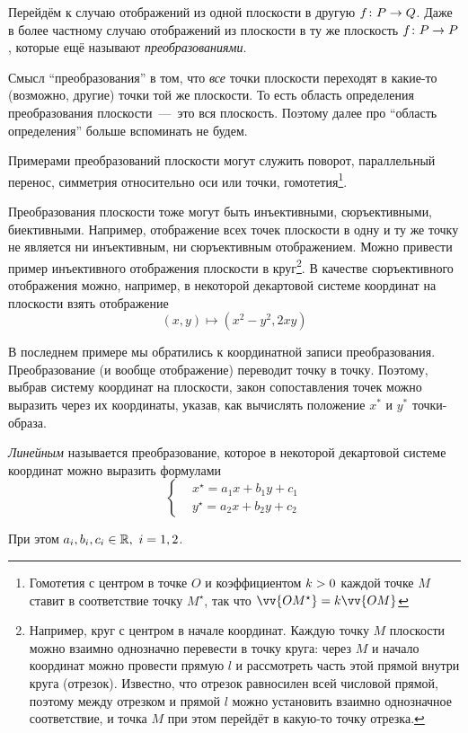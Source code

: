 \documentclass[a4paper,12pt]{article}
\begin{document}
  Перейдём к случаю отображений из одной плоскости в другую $f\colon P \hm\to Q$.
  Даже в более частному случаю отображений из плоскости в ту же плоскость $f\colon P \hm\to P$, которые ещё называют \emph{преобразованиями}.
  
  \begin{remark}
    Смысл ``преобразования'' в том, что \emph{все} точки плоскости переходят в какие-то (возможно, другие) точки той же плоскости.
    То есть область определения преобразования плоскости~---~это вся плоскость.
    Поэтому далее про ``область определения'' больше вспоминать не будем.
  \end{remark}
  
  Примерами преобразований плоскости могут служить поворот, параллельный перенос, симметрия относительно оси или точки, гомотетия\footnote{Гомотетия с центром в точке $O$ и коэффициентом $k \hm> 0 $ каждой точке $M$ ставит в соответствие точку $M^\star$, так что $\vv{OM^\star} \hm= k\vv{OM}$}.
  
  Преобразования плоскости тоже могут быть инъективными, сюръективными, биективными.
  Например, отображение всех точек плоскости в одну и ту же точку не является ни инъективным, ни сюръективным отображением.
  Можно привести пример инъективного отображения плоскости в круг\footnote{
    Например, круг с центром в начале координат.
    Каждую точку $M$ плоскости можно взаимно однозначно перевести в точку круга: через $M$ и начало координат можно провести прямую $l$ и рассмотреть часть этой прямой внутри круга (отрезок).
    Известно, что отрезок равносилен всей числовой прямой, поэтому между отрезком и прямой $l$ можно установить взаимно однозначное соответствие, и точка $M$ при этом перейдёт в какую-то точку отрезка.
  }.
  В качестве сюръективного отображения можно, например, в некоторой декартовой системе координат на плоскости взять отображение
  \[
    (x, y) \mapsto \left(x^2 - y^2, 2xy\right)
  \]
  
  В последнем примере мы обратились к координатной записи преобразования.
  Преобразование (и вообще отображение) переводит точку в точку.
  Поэтому, выбрав систему координат на плоскости, закон сопоставления точек можно выразить через их координаты, указав, как вычислять положение $x^*$ и $y^*$ точки-образа.
  
  \begin{definition}
    \emph{Линейным} называется преобразование, которое в некоторой декартовой системе координат можно выразить формулами
    \begin{equation}
      \label{eq:linear}
      \left\{
        \begin{aligned}
          &x^\star = a_1 x + b_1 y + c_1\\
          &y^\star = a_2 x + b_2 y + c_2
        \end{aligned}
      \right.
    \end{equation}
    
    При этом $a_i, b_i, c_i \hm\in \RR,\ i = 1, 2$.
  \end{definition}
  
\end{document}
